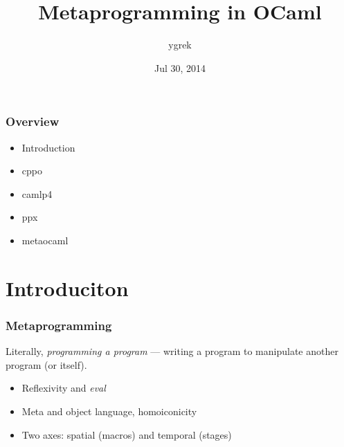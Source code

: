\usepackage[T1]{fontenc}
\usepackage[utf8]{inputenc}
\usepackage[english]{babel}
\usepackage{graphicx}
\usepackage{lmodern}
\usepackage{listings}
\usepackage{amssymb,amsfonts,amsmath,mathtext}
\usepackage{cite,enumerate,float,indentfirst}
\usepackage{hyperref}
\usepackage{color}

\hypersetup{colorlinks=true}



\newcommand{\cmd}[1]{\texttt{{#1}}}
\newcommand{\run}[1]{\begin{tiny}\cmd{{#1}}\end{tiny}}

\title{Metaprogramming in OCaml}
\author{ygrek}
\date{Jul 30, 2014}



\begin{frame}
\titlepage
\end{frame}

\begin{frame}
\frametitle{Overview}
 \begin{itemize}
  \item Introduction
  \item cppo
  \item camlp4
  \item ppx
  \item metaocaml
 \end{itemize}
\end{frame}

\section{Introduciton}

\begin{frame}
\frametitle{Metaprogramming}
Literally, \emph{programming a program} --- writing a program to manipulate another program (or itself).
\begin{itemize}
\item Reflexivity and \emph{eval}
\item Meta and object language, homoiconicity
\item Two axes: spatial (macros) and temporal (stages)
\end{itemize}
\end{frame}

